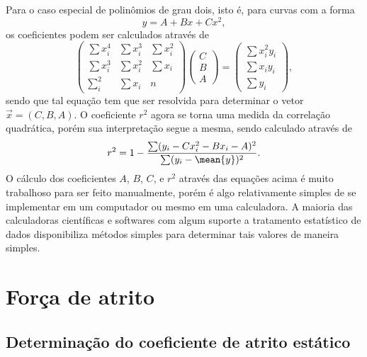 Para o caso especial de polinômios de grau dois, isto é, para curvas com a forma
\begin{equation}
    y = A + B x + C x^2,
\end{equation}
%
os coeficientes podem ser calculados através de
\begin{equation}
\begin{pmatrix}
\sum x_i^4 & \sum x_i^3 & \sum x_i^2 \\ \sum x_i^3 & \sum x_i^2 & \sum x_i \\ \sum_i^2 & \sum x_i & n \end{pmatrix} \begin{pmatrix} C \\ B \\ A \end{pmatrix} = \begin{pmatrix} \sum x_i^2y_i \\ \sum x_iy_i \\ \sum y_i \end{pmatrix},
\end{equation}
%
sendo que tal equação tem que ser resolvida para determinar o vetor $\vec{x} = (C, B, A)$. O coeficiente $r^2$ agora se torna uma medida da correlação quadrática, porém sua interpretação segue a mesma, sendo calculado através de
\begin{equation}
    r^2 = 1 - \frac{\sum (y_i - C x_i^2 - B x_i - A)^2}{\sum (y_i - \mean{y})^2}.
\end{equation}
%
O cálculo dos coeficientes $A$, $B$, $C$, e $r^2$ através das equações acima é muito trabalhoso para ser feito manualmente, porém é algo relativamente simples de se implementar em um computador ou mesmo em uma calculadora. A maioria das calculadoras científicas e softwares com algum suporte a tratamento estatístico de dados disponibiliza métodos simples para determinar tais valores de maneira simples.

\section{Força de atrito}

\subsection{Determinação do coeficiente de atrito estático}

